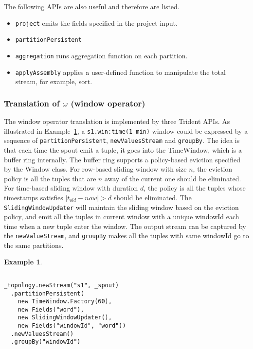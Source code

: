 \documentclass[conference, twocolumn, 11pt]{IEEEtran}
\theoremstyle{definition}
\newtheorem{example}{Example}[section]
\begin{document}
The following APIs are also useful and therefore are listed.
\begin{itemize}
\item \texttt{project} emits the fields specified in the project input.
\item \texttt{partitionPersistent}
\item \texttt{aggregation} runs aggregation function on each partition.
\item \texttt{applyAssembly} applies a user-defined function to manipulate the total stream, for example, sort.
\end{itemize}

\subsubsection{Translation of $\omega$ (window operator)}
The window operator translation is implemented by three Trident APIs. As illustrated in Example~\ref{win-trans}, a \texttt{s1.win:time(1 min)} window could be expressed by a sequence of \texttt{partitionPersistent}, \texttt{newValuesStream} and \texttt{groupBy}. The idea is that each time the spout emit a tuple, it goes into the TimeWindow, which is a buffer ring internally. The buffer ring supports a policy-based eviction specified by the Window class. For row-based sliding window with size $n$, the eviction policy is all the tuples that are $n$ away of the current one should be eliminated. For time-based sliding window with duration $d$, the policy is all the tuples whose timestamps satisfies $|t_{old} - now| > d$ should be eliminated. The \texttt{SlidingWindowUpdater} will maintain the sliding window based on the eviction policy, and emit all the tuples in current window with a unique windowId each time when a new tuple enter the window. The output stream can be captured by the \texttt{newValueStream}, and \texttt{groupBy} makes all the tuples with same windowId go to the same partitions. 
\begin{example}\label{win-trans}
\begin{verbatim}

_topology.newStream("s1", _spout) 
  .partitionPersistent(
    new TimeWindow.Factory(60),
    new Fields("word"), 
    new SlidingWindowUpdater(), 
    new Fields("windowId", "word"))
  .newValuesStream()
  .groupBy("windowId")
\end{verbatim}
\end{example}
\end{document}
